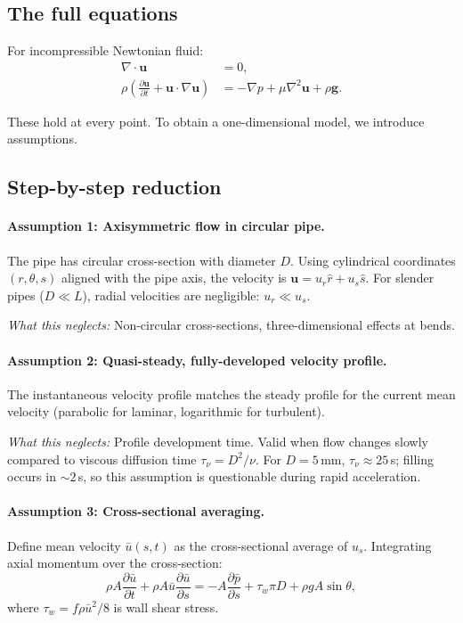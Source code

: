 \documentclass[11pt]{article}
\begin{document}
\subsection{The full equations}

For incompressible Newtonian fluid:
\begin{align}
  \nabla \cdot \mathbf{u} &= 0, \label{eq:NS-cont} \\
  \rho\left(\frac{\partial \mathbf{u}}{\partial t} + \mathbf{u} \cdot \nabla\mathbf{u}\right) &= -\nabla p + \mu\nabla^2\mathbf{u} + \rho\mathbf{g}. \label{eq:NS-mom}
\end{align}

These hold at every point. To obtain a one-dimensional model, we introduce assumptions.

\subsection{Step-by-step reduction}

\paragraph{Assumption 1: Axisymmetric flow in circular pipe.}
The pipe has circular cross-section with diameter $D$. Using cylindrical coordinates $(r, \theta, s)$ aligned with the pipe axis, the velocity is $\mathbf{u} = u_r\hat{r} + u_s\hat{s}$. For slender pipes ($D \ll L$), radial velocities are negligible: $u_r \ll u_s$.

\emph{What this neglects:} Non-circular cross-sections, three-dimensional effects at bends.

\paragraph{Assumption 2: Quasi-steady, fully-developed velocity profile.}
The instantaneous velocity profile matches the steady profile for the current mean velocity (parabolic for laminar, logarithmic for turbulent).

\emph{What this neglects:} Profile development time. Valid when flow changes slowly compared to viscous diffusion time $\tau_\nu = D^2/\nu$. For $D = 5$\,mm, $\tau_\nu \approx 25$\,s; filling occurs in $\sim 2$\,s, so this assumption is questionable during rapid acceleration.

\paragraph{Assumption 3: Cross-sectional averaging.}
Define mean velocity $\bar{u}(s,t)$ as the cross-sectional average of $u_s$. Integrating axial momentum over the cross-section:
\[
  \rho A \frac{\partial \bar{u}}{\partial t} + \rho A \bar{u}\frac{\partial \bar{u}}{\partial s} = -A\frac{\partial \bar{p}}{\partial s} + \tau_w \pi D + \rho g A \sin\theta,
\]
where $\tau_w = f\rho\bar{u}^2/8$ is wall shear stress.
\end{document}
